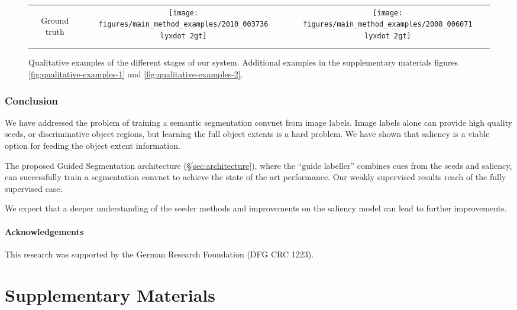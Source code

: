 \documentclass[british,10pt,twocolumn,letterpaper]{article}
\providecommand{\tabularnewline}{\\}
\newcommand{\lyxdot}{.}
\begin{document}
\begin{figure}
\begin{centering}
\begin{tabular}{ccc}
\begin{turn}{90}
Ground truth
\end{turn} & \texttt{[image: figures/main\_method\_examples/2010\_003736\\lyxdot 2gt]} & \texttt{[image: figures/main\_method\_examples/2008\_006071\\lyxdot 2gt]}\tabularnewline
\end{tabular}
\par\end{centering}
\caption{\label{fig:qualitative-examples}Qualitative examples of the different
stages of our system. Additional examples in the supplementary
materials figures \ref{fig:qualitative-examples-1} and \ref{fig:qualitative-examples-2}.}
\end{figure}



\section{\label{sec:Conclusion}Conclusion}

\noindent
We have addressed the problem of training a semantic segmentation
convnet from image labels. Image labels alone can provide high quality
seeds, or discriminative object regions, but learning the full object
extents is a hard problem. We have shown that saliency is a viable
option for feeding the object extent information.

The proposed Guided Segmentation architecture (\S\ref{sec:architecture}),
where the ``guide labeller'' combines cues from the seeds and saliency,
can successfully train a segmentation convnet to achieve the state
of the art performance. Our weakly supervised results reach 
of the fully supervised case.

We expect that a deeper understanding of the seeder methods and improvements
on the saliency model can lead to further improvements. 

\subsection*{Acknowledgements}

\noindent
This research was supported by the German Research Foundation (DFG CRC
1223).








\newpage
\appendix



\part*{Supplementary Materials}
\end{document}
